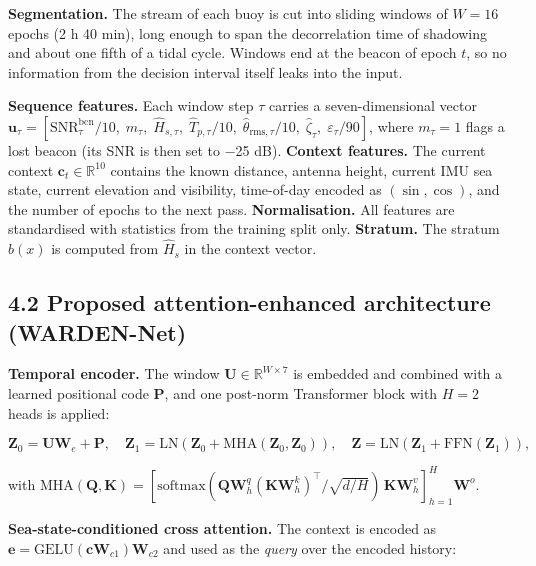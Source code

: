 \documentclass[
  11pt,
]{article}
\begin{document}
\textbf{Segmentation.} The stream of each buoy is cut into sliding
windows of \(W=16\) epochs (2 h 40 min), long enough to span the
decorrelation time of shadowing and about one fifth of a tidal cycle.
Windows end at the beacon of epoch \(t\), so no information from the
decision interval itself leaks into the input.

\textbf{Sequence features.} Each window step \(\tau\) carries a
seven-dimensional vector
\(\mathbf{u}_\tau=[\mathrm{SNR}^{\mathrm{bcn}}_\tau/10,\;m_\tau,\;\hat H_{s,\tau},\;\hat T_{p,\tau}/10,\;\hat\theta_{\mathrm{rms},\tau}/10,\;\hat\zeta_\tau,\;\varepsilon_\tau/90]\),
where \(m_\tau=1\) flags a lost beacon (its SNR is then set to −25 dB).
\textbf{Context features.} The current context
\(\mathbf{c}_t\in\mathbb{R}^{10}\) contains the known distance, antenna
height, current IMU sea state, current elevation and visibility,
time-of-day encoded as \((\sin,\cos)\), and the number of epochs to the
next pass. \textbf{Normalisation.} All features are standardised with
statistics from the training split only. \textbf{Stratum.} The stratum
\(b(x)\) is computed from \(\hat H_s\) in the context vector.

\hypertarget{proposed-attention-enhanced-architecture-warden-net}{%
\subsection{4.2 Proposed attention-enhanced architecture
(WARDEN-Net)}\label{proposed-attention-enhanced-architecture-warden-net}}

\textbf{Temporal encoder.} The window
\(\mathbf{U}\in\mathbb{R}^{W\times 7}\) is embedded and combined with a
learned positional code \(\mathbf{P}\), and one post-norm Transformer
block with \(H=2\) heads is applied:

\[\mathbf{Z}_0=\mathbf{U}\mathbf{W}_e+\mathbf{P},\quad \mathbf{Z}_1=\mathrm{LN}\left(\mathbf{Z}_0+\mathrm{MHA}(\mathbf{Z}_0,\mathbf{Z}_0)\right),\quad \mathbf{Z}=\mathrm{LN}\left(\mathbf{Z}_1+\mathrm{FFN}(\mathbf{Z}_1)\right), \tag{15}\]

with
\(\mathrm{MHA}(\mathbf{Q},\mathbf{K})=[\mathrm{softmax}(\mathbf{Q}\mathbf{W}^q_h(\mathbf{K}\mathbf{W}^k_h)^{\top}/\sqrt{d/H})\,\mathbf{K}\mathbf{W}^v_h]_{h=1}^{H}\mathbf{W}^o\).

\textbf{Sea-state-conditioned cross attention.} The context is encoded
as
\(\mathbf{e}=\mathrm{GELU}(\mathbf{c}\mathbf{W}_{c1})\mathbf{W}_{c2}\)
and used as the \emph{query} over the encoded history:
\end{document}
